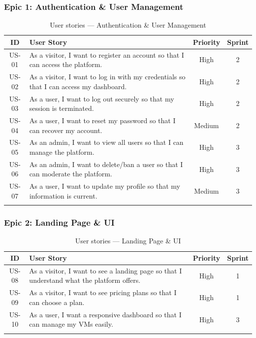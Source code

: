 \subsubsection{Epic 1: Authentication \& User Management}

\begin{longtable}{|c|p{7cm}|c|c|}
\hline
\rowcolor{blue!15}
\textbf{ID} & \textbf{User Story} & \textbf{Priority} & \textbf{Sprint} \\
\hline
\endhead
US-01 & As a visitor, I want to register an account so that I can access the platform. & High & 2 \\
\hline
US-02 & As a visitor, I want to log in with my credentials so that I can access my dashboard. & High & 2 \\
\hline
US-03 & As a user, I want to log out securely so that my session is terminated. & High & 2 \\
\hline
US-04 & As a user, I want to reset my password so that I can recover my account. & Medium & 2 \\
\hline
US-05 & As an admin, I want to view all users so that I can manage the platform. & High & 3 \\
\hline
US-06 & As an admin, I want to delete/ban a user so that I can moderate the platform. & High & 3 \\
\hline
US-07 & As a user, I want to update my profile so that my information is current. & Medium & 3 \\
\hline
\caption{User stories — Authentication \& User Management}
\label{tab:us-auth}
\end{longtable}

\subsubsection{Epic 2: Landing Page \& UI}

\begin{longtable}{|c|p{7cm}|c|c|}
\hline
\rowcolor{blue!15}
\textbf{ID} & \textbf{User Story} & \textbf{Priority} & \textbf{Sprint} \\
\hline
\endhead
US-08 & As a visitor, I want to see a landing page so that I understand what the platform offers. & High & 1 \\
\hline
US-09 & As a visitor, I want to see pricing plans so that I can choose a plan. & High & 1 \\
\hline
US-10 & As a user, I want a responsive dashboard so that I can manage my VMs easily. & High & 3 \\
\hline
\caption{User stories — Landing Page \& UI}
\label{tab:us-ui}
\end{longtable}

